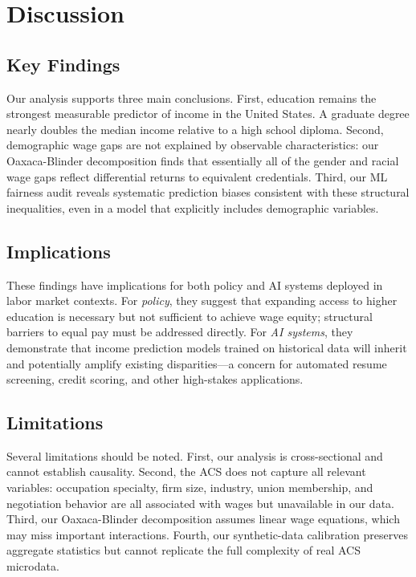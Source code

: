 \documentclass[11pt]{article}
\begin{document}
\section{Discussion}

\subsection{Key Findings}

Our analysis supports three main conclusions. First, education remains the
strongest measurable predictor of income in the United States. A graduate
degree nearly doubles the median income relative to a high school diploma.
Second, demographic wage gaps are not explained by observable characteristics:
our Oaxaca-Blinder decomposition finds that essentially all of the
gender and racial wage gaps reflect differential returns to equivalent
credentials. Third, our ML fairness audit reveals systematic prediction biases
consistent with these structural inequalities, even in a model that explicitly
includes demographic variables.

\subsection{Implications}

These findings have implications for both policy and AI systems deployed in
labor market contexts. For \textit{policy}, they suggest that expanding access
to higher education is necessary but not sufficient to achieve wage equity;
structural barriers to equal pay must be addressed directly. For
\textit{AI systems}, they demonstrate that income prediction models trained on
historical data will inherit and potentially amplify existing disparities---a
concern for automated resume screening, credit scoring, and other high-stakes
applications.

\subsection{Limitations}

Several limitations should be noted. First, our analysis is cross-sectional
and cannot establish causality. Second, the ACS does not capture all relevant
variables: occupation specialty, firm size, industry, union membership, and
negotiation behavior are all associated with wages but unavailable in our data.
Third, our Oaxaca-Blinder decomposition assumes linear wage equations, which
may miss important interactions. Fourth, our synthetic-data calibration
preserves aggregate statistics but cannot replicate the full complexity of
real ACS microdata.
\end{document}
